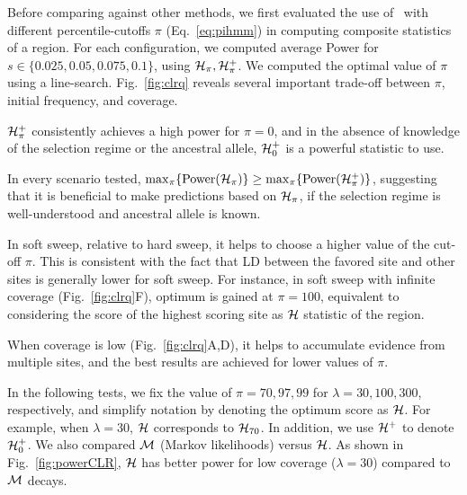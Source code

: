 Before comparing against other methods, we first evaluated the use of
\comale\ with different percentile-cutoffs $\pi$ (Eq.~\ref{eq:pihmm})
in computing composite statistics of a region. For each configuration,
we computed average Power for $s\in\{0.025,0.05,0.075,0.1\}$, using
${\cal H}_\pi,{\cal H}^{+}_\pi$. We computed the optimal value of $\pi$ using a
line-search. Fig.~\ref{fig:clrq} reveals several important trade-off
between $\pi$, initial frequency, and coverage.
\begin{packed_itemize}
\item ${\cal H}^{+}_\pi$ consistently achieves a high power for $\pi=0$,
  and in the absence of knowledge of the selection regime or the
  ancestral allele, ${\cal H}^{+}_0$ is a powerful statistic to use.
\item In every scenario tested,
  $\max_{\pi}\{\mbox{Power}({\cal H}_\pi)\}\ge
  \max_{\pi}\{\mbox{Power}({\cal H}^{+}_\pi)\}$, suggesting that it is beneficial to 
  make predictions based on ${\cal H}_{\pi}$, if the
  selection regime is well-understood and ancestral allele is known.
\item In soft sweep, relative to hard sweep, it helps to choose a
  higher value of the cut-off $\pi$. This is consistent with the fact that LD
  between the favored site and other sites is generally lower for
  soft sweep. For instance, in soft sweep with infinite coverage
  (Fig.~\ref{fig:clrq}F), optimum is gained at $\pi=100$, equivalent
  to considering the score of the highest scoring site as ${\cal H}$ statistic of 
  the region.
\item When coverage is low (Fig.~\ref{fig:clrq}A,D), it helps to
  accumulate evidence from multiple sites, and the best results are
  achieved for lower values of $\pi$.
\end{packed_itemize}
In the following tests, we fix the value of $\pi=70,97, 99$ for
$\lambda=30,100,300$, respectively, and simplify notation by
denoting the optimum score as ${\cal H}$. For example, when $\lambda=30$,
${\cal H}$ corresponds to ${\cal H}_{70}$. In addition, we use ${\cal H}^{+}$ to
denote ${\cal H}^{+}_0$. We also compared ${\cal M}$ (Markov likelihoods) versus
${\cal H}$. As shown in Fig.~\ref{fig:powerCLR}, ${\cal H}$ has better power for
low coverage ($\lambda=30$) compared to ${\cal M}$ decays.



